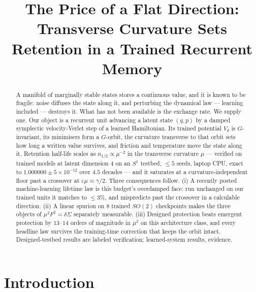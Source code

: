 \documentclass{article}
\title{The Price of a Flat Direction:\\ Transverse Curvature Sets Retention in a Trained Recurrent Memory}
\author{}
\begin{document}
\maketitle


\begin{abstract}
A manifold of marginally stable states stores a continuous value, and it is known to be fragile: noise diffuses the state along it, and perturbing the dynamical law --- learning included --- destroys it. What has not been available is the exchange rate. We supply one. Our object is a recurrent unit advancing a latent state $(q,p)$ by a damped symplectic velocity-Verlet step of a learned Hamiltonian. Its trained potential $V_\theta$ is $G$-invariant, its minimisers form a $G$-orbit, the curvature transverse to that orbit sets how long a written value survives, and friction and temperature move the state along it. Retention half-life scales as $n_{1/2}\propto\mu^{-2}$ in the transverse curvature $\mu$ --- verified on trained models at latent dimension $4$ on an $S^1$ testbed, $\le5$ seeds, laptop CPU, exact to $1.000000\pm5\!\times\!10^{-12}$ over $4.5$ decades --- and it saturates at a curvature-independent floor past a crossover at $\varepsilon\mu\approx\gamma/2$. Three consequences follow. (i) A recently posted machine-learning lifetime law is this budget's overdamped face: run unchanged on our trained units it matches to $\le3\%$, and mispredicts past the crossover in a calculable direction. (ii) A linear spurion on $8$ trained $SO(2)$ checkpoints makes the three objects of $\mu^2F^2=\delta\Sigma$ separately measurable. (iii) Designed protection beats emergent protection by $13$--$14$ orders of magnitude in $\mu^2$ on this architecture class, and every headline law survives the training-time correction that keeps the orbit intact. Designed-testbed results are labeled verification; learned-system results, evidence.
\end{abstract}

\section{Introduction}\label{sec:intro}
\end{document}
